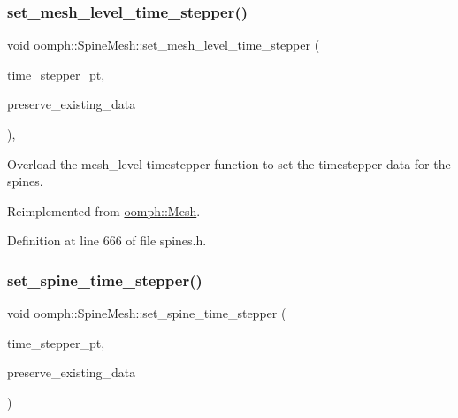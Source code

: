 \subsubsection{\texorpdfstring{set\+\_\+mesh\+\_\+level\+\_\+time\+\_\+stepper()}{set\_mesh\_level\_time\_stepper()}}
{\footnotesize\ttfamily void oomph\+::\+Spine\+Mesh\+::set\+\_\+mesh\+\_\+level\+\_\+time\+\_\+stepper (\begin{DoxyParamCaption}\item[{\hyperlink{classoomph_1_1TimeStepper}{Time\+Stepper} $\ast$const \&}]{time\+\_\+stepper\+\_\+pt,  }\item[{const bool \&}]{preserve\+\_\+existing\+\_\+data }\end{DoxyParamCaption})\hspace{0.3cm}{\ttfamily [inline]}, {\ttfamily [virtual]}}



Overload the mesh\+\_\+level timestepper function to set the timestepper data for the spines. 



Reimplemented from \hyperlink{classoomph_1_1Mesh_a52c30b4ebc67038e137a5de1c5d422e5}{oomph\+::\+Mesh}.



Definition at line 666 of file spines.\+h.

\mbox{\label{classoomph_1_1SpineMesh_a96c6e27c4029aa2424d00e138c30de2c}} 
\subsubsection{\texorpdfstring{set\+\_\+spine\+\_\+time\+\_\+stepper()}{set\_spine\_time\_stepper()}}
{\footnotesize\ttfamily void oomph\+::\+Spine\+Mesh\+::set\+\_\+spine\+\_\+time\+\_\+stepper (\begin{DoxyParamCaption}\item[{\hyperlink{classoomph_1_1TimeStepper}{Time\+Stepper} $\ast$const \&}]{time\+\_\+stepper\+\_\+pt,  }\item[{const bool \&}]{preserve\+\_\+existing\+\_\+data }\end{DoxyParamCaption})}



